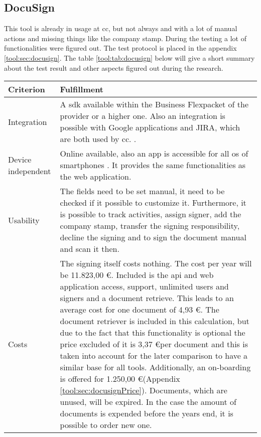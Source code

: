 \subsection{DocuSign}
This tool is already in usage at \gls{cc}, but not always and with a lot of manual actions and missing things like the company stamp. During the testing a lot of functionalities were figured out. The test protocol is placed in the appendix \ref{tool:sec:docusign}. The table \ref{tool:tab:docusign} below will give a short summary about the test result and other aspects figured out during the research.

	
	\begin{longtable}{|p{4cm}|p{10cm}|} \hline
		\rowcolor{Gray}Criterion & Fulfillment \\ \hline
		Integration &  A \gls{sdk} available within the \grqq Business Flex\grqq packet of the provider or a higher one. Also an integration is possible with Google applications and JIRA, which are both used by \gls{cc}. \parencite{docusign2018integration,docusign2018formats,docusign2018google,docusign2018jira}. \\ \hline
		Device independent & Online available, also an \gls{app} is accessible for all \gls{os} of smartphones \parencite{docusign2018mobile}. It provides the same functionalities as the web application. \\ \hline
		Usability &  The fields need to be set manual, it need to be checked if it possible to customize it. Furthermore, it is possible to track activities, assign signer, add the company stamp, transfer the signing responsibility, decline the signing and to sign the document manual and scan it then. \\ \hline
		Costs & The signing itself costs nothing. The cost per year will be 11.823,00 \euro. Included is the \gls{api} and web application access, support, unlimited users and signers and a document retrieve. This leads to an average cost for one document of 4,93 \euro. The document retriever is included in this calculation, but due to the fact that this functionality is optional the price excluded of it is 3,37 \euro per document and this is taken into account for the later comparison to have a similar base for all tools. Additionally, an on-boarding is offered for 1.250,00 \euro (Appendix \ref{tool:sec:docusignPrice}). Documents, which are unused, will be expired. In the case the amount of documents is expended before the years end, it is possible to order new one. \\ \hline

\end{longtable}
